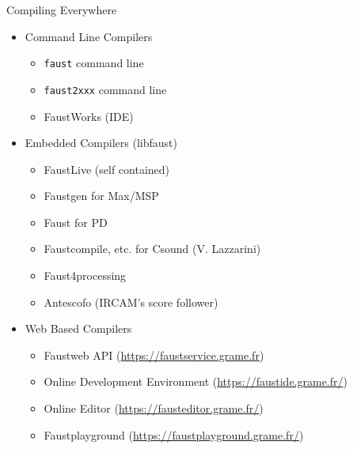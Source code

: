 \begin{frame}{Compiling Everywhere}
    \begin{itemize}
    \item Command Line Compilers
        \begin{itemize}
        \item \lstinline'faust' command line
        \item \lstinline'faust2xxx' command line
        \item FaustWorks (IDE)
        \end{itemize}
    \item Embedded Compilers (libfaust)
        \begin{itemize}
        \item FaustLive (self contained)
        \item Faustgen for Max/MSP
        \item Faust for PD
        \item Faustcompile, etc. for Csound (V. Lazzarini)
        \item Faust4processing
        \item Antescofo (IRCAM's score follower)
        \end{itemize}
    \item Web Based Compilers
        \begin{itemize}
        \item Faustweb API (\url{https://faustservice.grame.fr})
        \item Online Development Environment (\url{https://faustide.grame.fr/})
        \item Online Editor (\url{https://fausteditor.grame.fr/})
        \item Faustplayground (\url{https://faustplayground.grame.fr/})
        \end{itemize}
    \end{itemize}
\end{frame}
